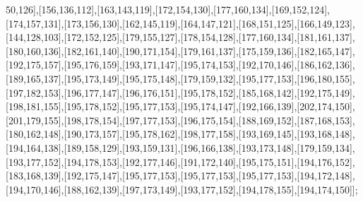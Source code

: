 50,126],[156,136,112],[163,143,119],[172,154,130],[177,160,134],[169,152,124],[174,157,131],[173,156,130],[162,145,119],[164,147,121],[168,151,125],[166,149,123],[144,128,103],[172,152,125],[179,155,127],[178,154,128],[177,160,134],[181,161,137],[180,160,136],[182,161,140],[190,171,154],[179,161,137],[175,159,136],[182,165,147],[192,175,157],[195,176,159],[193,171,147],[195,174,153],[192,170,146],[186,162,136],[189,165,137],[195,173,149],[195,175,148],[179,159,132],[195,177,153],[196,180,155],[197,182,153],[196,177,147],[196,176,151],[195,178,152],[185,168,142],[192,175,149],[198,181,155],[195,178,152],[195,177,153],[195,174,147],[192,166,139],[202,174,150],[201,179,155],[198,178,154],[197,177,153],[196,175,154],[188,169,152],[187,168,153],[180,162,148],[190,173,157],[195,178,162],[198,177,158],[193,169,145],[193,168,148],[194,164,138],[189,158,129],[193,159,131],[196,166,138],[193,173,148],[179,159,134],[193,177,152],[194,178,153],[192,177,146],[191,172,140],[195,175,151],[194,176,152],[183,168,139],[192,175,147],[195,177,153],[195,177,153],[195,177,153],[194,172,148],[194,170,146],[188,162,139],[197,173,149],[193,177,152],[194,178,155],[194,174,150]];

